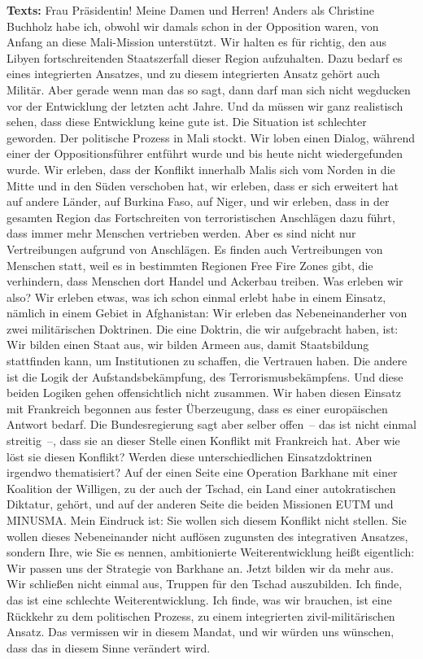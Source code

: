 \documentclass{article}
\begin{document}
\noindent\textbf{Texts:} Frau Präsidentin! Meine Damen und Herren! Anders als Christine Buchholz habe ich, obwohl wir damals schon in der Opposition waren, von Anfang an diese Mali-Mission unterstützt. Wir halten es für richtig, den aus Libyen fortschreitenden Staatszerfall dieser Region aufzuhalten. Dazu bedarf es eines integrierten Ansatzes, und zu diesem integrierten Ansatz gehört auch Militär. Aber gerade wenn man das so sagt, dann darf man sich nicht wegducken vor der Entwicklung der letzten acht Jahre. Und da müssen wir ganz realistisch sehen, dass diese Entwicklung keine gute ist. Die Situation ist schlechter geworden. Der politische Prozess in Mali stockt. Wir loben einen Dialog, während einer der Oppositionsführer entführt wurde und bis heute nicht wiedergefunden wurde. Wir erleben, dass der Konflikt innerhalb Malis sich vom Norden in die Mitte und in den Süden verschoben hat, wir erleben, dass er sich erweitert hat auf andere Länder, auf Burkina Faso, auf Niger, und wir erleben, dass in der gesamten Region das Fortschreiten von terroristischen Anschlägen dazu führt, dass immer mehr Menschen vertrieben werden. Aber es sind nicht nur Vertreibungen aufgrund von Anschlägen. Es finden auch Vertreibungen von Menschen statt, weil es in bestimmten Regionen Free Fire Zones gibt, die verhindern, dass Menschen dort Handel und Ackerbau treiben. Was erleben wir also? Wir erleben etwas, was ich schon einmal erlebt habe in einem Einsatz, nämlich in einem Gebiet in Afghanistan: Wir erleben das Nebeneinanderher von zwei militärischen Doktrinen. Die eine Doktrin, die wir aufgebracht haben, ist: Wir bilden einen Staat aus, wir bilden Armeen aus, damit Staatsbildung stattfinden kann, um Institutionen zu schaffen, die Vertrauen haben. Die andere ist die Logik der Aufstandsbekämpfung, des Terrorismusbekämpfens. Und diese beiden Logiken gehen offensichtlich nicht zusammen.  Wir haben diesen Einsatz mit Frankreich begonnen aus fester Überzeugung, dass es einer europäischen Antwort bedarf. Die Bundesregierung sagt aber selber offen – das ist nicht einmal streitig –, dass sie an dieser Stelle einen Konflikt mit Frankreich hat.  Aber wie löst sie diesen Konflikt? Werden diese unterschiedlichen Einsatzdoktrinen irgendwo thematisiert? Auf der einen Seite eine Operation Barkhane mit einer Koalition der Willigen, zu der auch der Tschad, ein Land einer autokratischen Diktatur, gehört, und auf der anderen Seite die beiden Missionen EUTM und MINUSMA. Mein Eindruck ist: Sie wollen sich diesem Konflikt nicht stellen. Sie wollen dieses Nebeneinander nicht auflösen zugunsten des integrativen Ansatzes, sondern Ihre, wie Sie es nennen, ambitionierte Weiterentwicklung heißt eigentlich: Wir passen uns der Strategie von Barkhane an. Jetzt bilden wir da mehr aus.  Wir schließen nicht einmal aus, Truppen für den Tschad auszubilden. Ich finde, das ist eine schlechte Weiterentwicklung.  Ich finde, was wir brauchen, ist eine Rückkehr zu dem politischen Prozess, zu einem integrierten zivil-militärischen Ansatz. Das vermissen wir in diesem Mandat, und wir würden uns wünschen, dass das in diesem Sinne verändert wird.  
\end{document}
